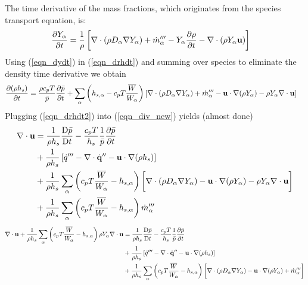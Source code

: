 The time derivative of the mass fractions, which originates from the species transport equation, is:
\begin{align}
\label{eqn_dydt}
\frac{\partial Y_\alpha}{\partial t} &= \frac{1}{\rho} \left[ \nabla\cdot (\rho D_\alpha \nabla Y_\alpha) + \dot{m}_\alpha^{\prime\prime\prime} - Y_\alpha \frac{\partial \rho}{\partial t} - \nabla\cdot (\rho Y_\alpha \mathbf{u}) \right]
\end{align}
Using (\ref{eqn_dydt}) in (\ref{eqn_drhdt}) and summing over species to eliminate the density time derivative we obtain
\begin{align}
\label{eqn_drhdt2}
\frac{\partial (\rho h_s)}{\partial t} &= \frac{\rho c_p T}{\bar{p}} \frac{\partial \bar{p}}{\partial t}  + \sum_\alpha \left( h_{s,\alpha} - c_p T \frac{\overline{W}}{W_\alpha}\right)\left[ \nabla\cdot (\rho D_\alpha \nabla Y_\alpha) + \dot{m}_\alpha^{\prime\prime\prime} - \mathbf{u}\cdot\nabla(\rho Y_\alpha) - \rho Y_\alpha \nabla\cdot \mathbf{u} \right]
\end{align}
Plugging (\ref{eqn_drhdt2}) into (\ref{eqn_div_new}) yields (almost done)
\begin{align}
\label{eqn_div_3}
\nabla\cdot \mathbf{u} &= \frac{1}{\rho h_s}\frac{\mbox{D} \bar{p}}{\mbox{D} t} - \frac{c_p T}{h_s}\frac{1}{\bar{p}} \frac{\partial \bar{p}}{\partial t} \notag\\
&+ \frac{1}{\rho h_s}\left[ \dot{q}^{\prime\prime\prime} - \nabla\cdot \dot{\mathbf{q}}^{\prime\prime} - \mathbf{u} \cdot\nabla (\rho h_s) \right] \notag\\
&+ \frac{1}{\rho h_s} \sum_\alpha \left(c_p T\frac{\overline{W}}{W_\alpha} - h_{s,\alpha} \right) \bigg[ \nabla\cdot (\rho D_\alpha \nabla Y_\alpha) - \mathbf{u} \cdot \nabla (\rho Y_\alpha) - \rho Y_\alpha \nabla\cdot \mathbf{u} \bigg] \notag\\
&+ \frac{1}{\rho h_s} \sum_\alpha \left(c_p T\frac{\overline{W}}{W_\alpha} - h_{s,\alpha} \right) \dot{m}_\alpha^{\prime\prime\prime}
\end{align}
\begin{align}
\label{eqn_div_4}
\nabla\cdot \mathbf{u} + \frac{1}{\rho h_s} \sum_\alpha \left(c_p T\frac{\overline{W}}{W_\alpha} - h_{s,\alpha} \right) \rho Y_\alpha \nabla\cdot \mathbf{u}  &= \frac{1}{\rho h_s}\frac{\mbox{D} \bar{p}}{\mbox{D} t} - \frac{c_p T}{h_s}\frac{1}{\bar{p}} \frac{\partial \bar{p}}{\partial t} \notag\\
&+ \frac{1}{\rho h_s}\left[ \dot{q}^{\prime\prime\prime} - \nabla\cdot \dot{\mathbf{q}}^{\prime\prime} - \mathbf{u} \cdot\nabla (\rho h_s) \right] \notag\\
&+ \frac{1}{\rho h_s} \sum_\alpha \left(c_p T\frac{\overline{W}}{W_\alpha} - h_{s,\alpha} \right) \bigg[ \nabla\cdot (\rho D_\alpha \nabla Y_\alpha) - \mathbf{u} \cdot \nabla (\rho Y_\alpha) + \dot{m}_\alpha^{\prime\prime\prime}\bigg]
\end{align}
